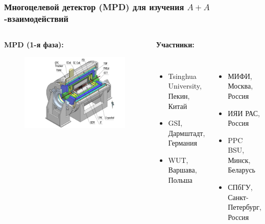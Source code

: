 \documentclass[dvipsnames] {beamer}
\begin{document}
\begin{frame}
  \bf
   \vskip -0.3cm
  \frametitle{\centering \bf {\small Многоцелевой детектор (MPD) для изучения $A + A$-взаимодействий}}
  \begin{columns}[t]
    \vskip -0.5cm
    \begin{block}{\bf \centering MPD (1-я фаза):}
      \begin{figure}[H]
        \includegraphics[width=1.\textwidth]{mpd.png} 
      \end{figure}
    \end{block}
    \vskip -0.3cm
           {\tiny 
             \begin{block}{\bf \centering Участники:}           
               \begin{columns}[t]
                 \vskip -0.4cm
                 \begin{itemize}
                 \item Tsinghua University, Пекин, Китай
                 \item GSI, Дармштадт, Германия
                 \item WUT, Варшава, Польша  
                 \end{itemize}
                 
                 \vskip -0.3cm
                 \begin{itemize}
                 \item МИФИ, Москва, Россия 
                 \item ИЯИ РАС, Россия
                 \item PPC BSU, Минск, Беларусь
                 \item СПбГУ, Санкт-Петербург, Россия
                 \end{itemize}           
               \end{columns}
             \end{block}
           }
           

\end{columns}
\end{frame}
\end{document}
